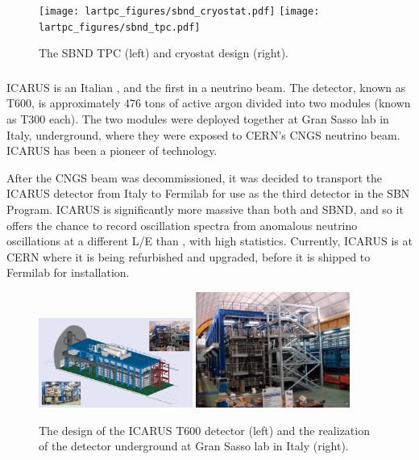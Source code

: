 \begin{figure}[htb]
  \centering
  \texttt{[image: lartpc\_figures/sbnd\_cryostat.pdf]}
  \texttt{[image: lartpc\_figures/sbnd\_tpc.pdf]}
  \caption[\sbnd Design]{The SBND TPC (left) and cryostat design (right).}
  \label{fig:sbnd_det}
\end{figure}


\subsubsection{\label{subsec:icarus} \icarus}

ICARUS is an Italian \lartpc, and the first \lartpc in a neutrino beam.  The detector, known as T600, is approximately 476 tons of active argon divided into two modules (known as T300 each).  The two modules were deployed together at Gran Sasso lab in Italy, underground, where they were exposed to CERN's CNGS neutrino beam.  ICARUS has been a pioneer of \lartpc technology.

After the CNGS beam was decommissioned, it was decided to transport the ICARUS detector from Italy to Fermilab for use as the third detector in the SBN Program.  ICARUS is significantly more massive than both \uboone and SBND, and so it offers the chance to record oscillation spectra from anomalous neutrino oscillations at a different L/E than \uboone, with high statistics.  Currently, ICARUS is at CERN where it is being refurbished and upgraded, before it is shipped to Fermilab for installation.

\begin{figure}[htb]
  \centering
  \includegraphics[width=0.45\textwidth]{lartpc_figures/icarus.jpg}
  \includegraphics[width=0.45\textwidth]{lartpc_figures/icarus_real.png}
  \caption[ICARUS T600]{The design of the ICARUS T600 detector (left) and the realization of the detector underground at Gran Sasso lab in Italy (right).}
  \label{fig:icarus}
\end{figure}


\FloatBarrier

